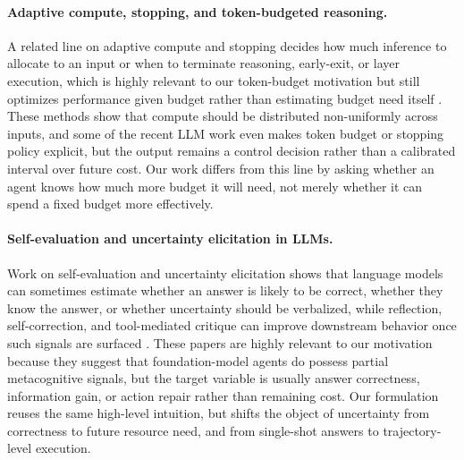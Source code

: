 \paragraph{Adaptive compute, stopping, and token-budgeted reasoning.}
A related line on adaptive compute and stopping decides how much inference to allocate to an input or when to terminate reasoning, early-exit, or layer execution, which is highly relevant to our token-budget motivation but still optimizes performance given budget rather than estimating budget need itself \cite{zhou2026adaptive,graves2016adaptive,teerapittayanon2016branchynet,wang2018skipnet,kaya2019shallowdeep,chen2020learningtostop,zeng2023learningtoskip,snell2025scaling,muennighoff2025s1}. These methods show that compute should be distributed non-uniformly across inputs, and some of the recent LLM work even makes token budget or stopping policy explicit, but the output remains a control decision rather than a calibrated interval over future cost. Our work differs from this line by asking whether an agent knows how much more budget it will need, not merely whether it can spend a fixed budget more effectively.

\paragraph{Self-evaluation and uncertainty elicitation in LLMs.}
Work on self-evaluation and uncertainty elicitation shows that language models can sometimes estimate whether an answer is likely to be correct, whether they know the answer, or whether uncertainty should be verbalized, while reflection, self-correction, and tool-mediated critique can improve downstream behavior once such signals are surfaced \cite{kadavath2022language,xiong2024can,kapoor2024large,yona2024can,deng2024towards,manakul2023selfcheckgpt,madaan2023selfrefine,shinn2023reflexion,gou2024critic,liu2024intrinsicselfcorrection,hu2024uncertainty,wang2024devils}. These papers are highly relevant to our motivation because they suggest that foundation-model agents do possess partial metacognitive signals, but the target variable is usually answer correctness, information gain, or action repair rather than remaining cost. Our formulation reuses the same high-level intuition, but shifts the object of uncertainty from correctness to future resource need, and from single-shot answers to trajectory-level execution.

